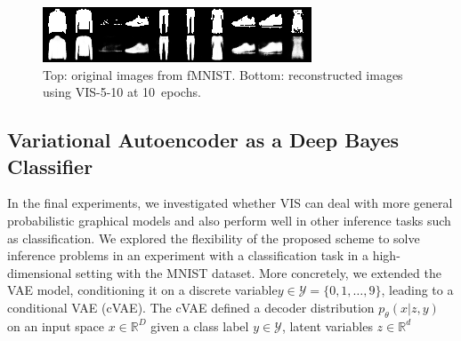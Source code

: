 \unskip
\begin{figure}[h]

\includegraphics[width=\linewidth]{img/reconstruction_mnist_gauss8_5_10_0_.png}

  \caption{Top: original images from fMNIST. Bottom: reconstructed images using VIS-5-10 at 10~epochs.}\label{fig:reco2}
\end{figure}

\subsection{Variational Autoencoder as a Deep Bayes Classifier}\label{sec:exp}
In the final experiments, we investigated whether VIS can deal with more general probabilistic graphical models and also perform well in other inference tasks such as classification.
We explored the flexibility of the proposed scheme to solve inference problems in an experiment with a classification task in a high-dimensional setting %
with the MNIST dataset.
More concretely, we extended the VAE model, conditioning it on a discrete variable\linebreak $y \in \mathcal{Y} = \lbrace 0, 1, \ldots, 9 \rbrace$, leading to a conditional VAE (cVAE). The cVAE defined a decoder distribution $p_\theta(x | z, y)$ on an input space $x \in \mathbb{R}^D$ given a class label $y \in \mathcal{Y}$, latent variables $z \in \mathbb{R}^d$ 


